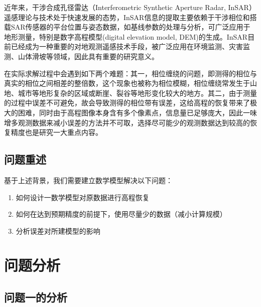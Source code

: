 \documentclass[a4paper]{article}
\begin{document}
	近年来，干涉合成孔径雷达（Interferometric Synthetic Aperture Radar, InSAR）遥感理论与技术处于快速发展的态势，InSAR信息的提取主要依赖于干涉相位和搭载SAR传感器的平台位置与姿态数据，如基线参数的处理与分析，可广泛应用于地形测量，特别是数字高程模型(digital elevation model, DEM)的生成。InSAR目前已经成为一种重要的对地观测遥感技术手段，被广泛应用在环境监测、灾害监测、山体滑坡等领域，因此具有重要的研究意义。\par
	在实际求解过程中会遇到如下两个难题：其一，相位缠绕的问题，即测得的相位与真实的相位之间相差的整倍数，这个现象也被称为相位模糊，相位缠绕常发生于山地、城市等地形复杂的区域或断崖、裂谷等地形变化较大的地方。其二，由于测量的过程中误差不可避免，故会导致测得的相位带有误差，这给高程的恢复带来了极大的困难，同时由于高程图像本身含有多个像素点，信息量已足够庞大，因此一味增多观测数据来减小误差的方法并不可取，选择尽可能少的观测数据达到较高的恢复精度也是研究一大重点内容。
	
	
	\subsection{问题重述}
	
	基于上述背景，我们需要建立数学模型解决以下问题：

	\begin{enumerate}[itemindent=0.5cm]
		\item 如何设计一数学模型对原数据进行高程恢复
		\item 如何在达到预期精度的前提下，使用尽量少的数据（减小计算规模）
		\item 分析误差对所建模型的影响
	\end{enumerate}
	
	\section{问题分析}
	\subsection{问题一的分析}
\end{document}
